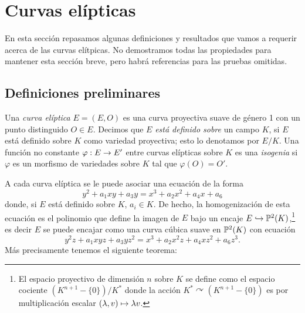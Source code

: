 \section{Curvas el\'ipticas}

En esta secci\'on repasamos algunas definiciones y resultados que vamos a requerir acerca
de las curvas el\'itpicas. No demostramos todas las propiedades para mantener esta secci\'on breve,
pero habr\'a referencias para las pruebas omitidas.

\subsection{Definiciones preliminares}\label{sec:preliminares_curvas}%

\begin{defin}
  Una \emph{curva el\'iptica} $E=(E,O)$ es una curva proyectiva suave de g\'enero 1 con un punto
  distinguido $O\in E$. Decimos que $E$ \emph{est\'a definido sobre} un campo $K$, si $E$ est\'a
  definido sobre $K$ como variedad proyectiva; esto lo denotamos por $E/K$. Una funci\'on no
  constante $\varphi:E\rightarrow E'$ entre curvas el\'ipticas sobre $K$ es una \emph{isogenia} si
  $\varphi$ es un morfismo de variedades sobre $K$ tal que $\varphi(O)=O'$.
\end{defin}

A cada curva el\'iptica se le puede asociar una ecuaci\'on de la forma
\[
  y^2+a_1xy+a_3y=x^3+a_2x^2+a_4x+a_6
\]
donde, si $E$ est\'a definido sobre $K$, $a_i\in K$. De hecho, la homogenizaci\'on de esta
ecuaci\'on es el polinomio que define la imagen de $E$ bajo un encaje
$E\hookrightarrow\mathbb{P}^2(K)$,\footnote{El espacio proyectivo de dimensi\'on $n$ sobre $K$ se define
  como el espacio cociente $(K^{n+1}-\{0\})/K^*$ donde la acci\'on
  $K^*\curvearrowright(K^{n+1}-\{0\})$ es por multiplicaci\'on escalar $(\lambda,v)\mapsto\lambda v$.}
es decir $E$ se puede encajar como una curva c\'ubica suave en $\mathbb{P}^2(K)$ con ecuaci\'on
\begin{equation}\label{eq:weierstrass-homogenizada}
  y^2z+a_1xyz+a_3yz^2=x^3+a_2x^2z+a_4xz^2+a_6z^3.
\end{equation}
Más precisamente tenemos el siguiente teorema:


